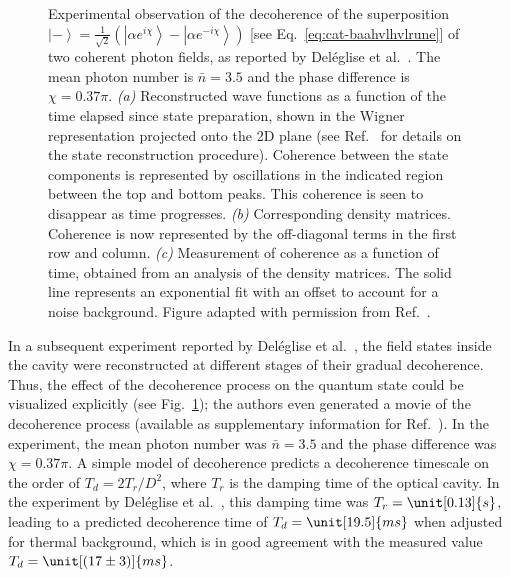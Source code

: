 \documentclass[3p,sort&compress,12pt]{elsarticle}
\newcommand{\ket}[1]{\left\vert{#1}\right\rangle}
\newcommand{\E}{\ensuremath{e}}
\newcommand{\I}{\ensuremath{i}}
\begin{document}
\begin{figure}
\caption{Experimental observation of the decoherence of the superposition $\ket{-} = \frac{1}{\sqrt{2}} \left( \ket{\alpha \E^{\I \chi}} - \ket{\alpha \E^{-\I \chi}} \right)$ [see Eq.~\eqref{eq:cat-baahvlhvlrune}] of two coherent photon fields, as reported by Del{\'e}glise et al.\ \cite{Deleglise:2008:oo}. The mean photon number is $\bar{n}=3.5$ and the phase difference is $\chi=0.37\pi$. \emph{(a)} Reconstructed wave functions as a function of the time elapsed since state preparation, shown in the Wigner representation projected onto the 2D plane \cite{Wigner:1932:un,Hillery:1984:tv} (see Ref.~\cite{Deleglise:2008:oo} for details on the state reconstruction procedure). Coherence between the state components is represented by oscillations in the indicated region between the top and bottom peaks. This coherence is seen to disappear as time progresses. \emph{(b)} Corresponding density matrices. Coherence is now represented by the off-diagonal terms in the first row and column. \emph{(c)} Measurement of coherence as a function of time, obtained from an analysis of the density matrices. The solid line represents an exponential fit with an offset to account for a noise background.  Figure adapted with permission from Ref.~\cite{Deleglise:2008:oo}.}
\label{fig:qeddecoh}
\end{figure}

In a subsequent experiment reported by Del{\'e}glise et al.\ \cite{Deleglise:2008:oo}, the field states inside the cavity were reconstructed at different stages of their gradual decoherence. Thus, the effect of the decoherence process on the quantum state could be visualized explicitly (see Fig.~\ref{fig:qeddecoh}); the authors even generated a movie of the decoherence process (available as supplementary information for Ref.~\cite{Deleglise:2008:oo}).  In the experiment, the mean photon number was $\bar{n}=3.5$ and the phase difference was $\chi=0.37\pi$. A simple model of decoherence \cite{Walls:1985:pp,Brune:1992:zz,Haroche:2006:hh} predicts a decoherence timescale on the order of $T_d=2T_r/D^2$, where $T_r$ is the damping time of the optical cavity. In the experiment by Del{\'e}glise et al.\ \cite{Deleglise:2008:oo}, this damping time was $T_r=\unit[0.13]{s}$, leading to a predicted decoherence time of $T_d=\unit[19.5]{ms}$ when adjusted for thermal background, which is in good agreement with the measured value $T_d=\unit[(17 \pm 3)]{ms}$. 
\end{document}
